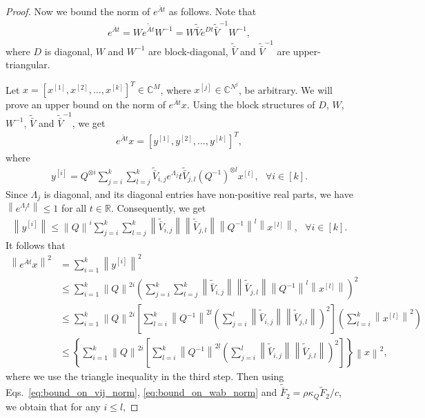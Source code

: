 \documentclass[superscriptaddress,onecolumn,nofootinbib,longbibliography,a4paper,accepted=2026-09-29]{quantumarticle}
\theoremstyle{plain}
\theoremstyle{definition}
\numberwithin{thm}{section}
\numberwithin{assumption}{section}
\numberwithin{lemma}{section}
\numberwithin{prop}{section}
\numberwithin{cor}{section}
\numberwithin{definition}{section}
\numberwithin{rmk}{section}
\numberwithin{equation}{section}
\newcommand{\norm}[1]     {\left\| #1 \right\|}
\newcommand{\R}{\mathbb{R}}
\newcommand{\myC}{\mathbb{C}}
\newcommand{\lrb}[1]{\left ( #1 \right )}
\newcommand{\lrsb}[1]{\left [ #1 \right ]}
\newcommand{\lrcb}[1]{\left \{ #1 \right \}}
\begin{document}
\begin{proof}
Now we bound the norm of $e^{\bar{A}t}$ as follows. Note that
\begin{align}
e^{\bar{A}t}=W e^{\tilde{\bar{A}}t} W^{-1}  
=W \tilde{\bar{V}} e^{Dt} \tilde{\bar{V}}^{-1}  W^{-1},
\end{align}
where $D$ is diagonal, $W$ and $W^{-1}$ are block-diagonal, $\tilde{\bar{V}}$ and $\tilde{\bar{V}}^{-1}$ are upper-triangular.

Let $x=[x^{[1]}, x^{[2]}, \dots, x^{[k]}]^T \in \myC^M$, where $x^{[j]} \in \myC^{N^j}$, be arbitrary. We will prove an upper bound on the norm of $e^{\bar{A}t} x$. Using the block structures of $D$, $W$, $W^{-1}$, $\tilde{\bar{V}}$ and $\tilde{\bar{V}}^{-1}$, we get
\begin{align}
    e^{\bar{A}t} x = [y^{[1]}, y^{[2]}, \dots, y^{[k]}]^T,
\end{align}
where
\begin{align}
    y^{[i]}=Q^{\otimes i} \sum_{j=i}^{k} \sum_{l=j}^k \tilde{\bar{V}}_{i,j} e^{\Lambda_j}t \tilde{\bar{V}}_{j,l} (Q^{-1})^{\otimes l} x^{[l]},~~~\forall i \in [k].
\end{align}
Since $\Lambda_j$ is diagonal, and
its diagonal entries have non-positive real parts, we have $\norm{e^{\Lambda_j t}} \le 1$ for all $t \in \R$. Consequently, we get
\begin{align}
    \norm{y^{[i]}}\le \norm{Q}^i \sum_{j=i}^{k} \sum_{l=j}^k \norm{\tilde{\bar{V}}_{i,j}}  \norm{\tilde{\bar{V}}_{j,l}} \norm{Q^{-1}}^l \norm{x^{[l]}},~~~\forall i \in [k].
\end{align}
It follows that
\begin{align}
\norm{e^{\bar{A}t} x}^2 
&=\sum_{i=1}^k \norm{y^{[i]}}^2 \\
&\le 
\sum_{i=1}^k 
\norm{Q}^{2i} \lrb{\sum_{j=i}^{k} \sum_{l=j}^k \norm{\tilde{\bar{V}}_{i,j}}  \norm{\tilde{\bar{V}}_{j,l}} \norm{Q^{-1}}^l \norm{x^{[l]}}}^2 \\
&\le 
\sum_{i=1}^k 
\norm{Q}^{2i} \lrsb{\sum_{l=i}^k \norm{Q^{-1}}^{2l}\lrb{\sum_{j=i}^{l}   \norm{\tilde{\bar{V}}_{i,j}}  \norm{\tilde{\bar{V}}_{j,l}} }^2}
\lrb{\sum_{l=i}^k \norm{x^{[l]}}^2} \\
&\le 
\lrcb{\sum_{i=1}^k 
\norm{Q}^{2i} \lrsb{\sum_{l=i}^k \norm{Q^{-1}}^{2l}\lrb{\sum_{j=i}^{l}   \norm{\tilde{\bar{V}}_{i,j}}  \norm{\tilde{\bar{V}}_{j,l}} }^2}} \norm{x}^2,
\label{eq:bound_exp_at_x}
\end{align}
where we use the triangle inequality in 
the third step. Then using Eqs.~\eqref{eq:bound_on_vij_norm},  \eqref{eq:bound_on_wab_norm} and $\tilde{\bar{F}}_2=\rho \kappa_Q \tilde{F}_2/c$, we obtain that for any $i \le l$,

\end{proof}
\end{document}
